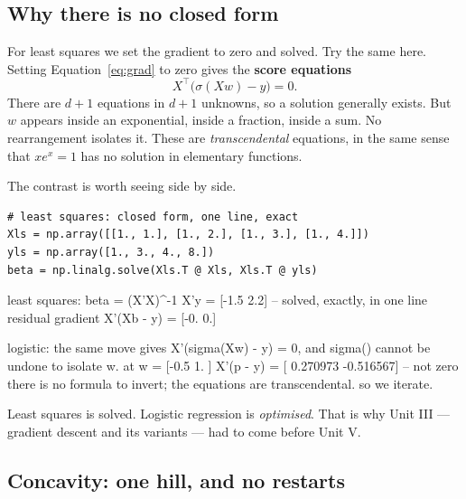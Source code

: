 \documentclass[11pt]{article}
\begin{document}
\subsection{Why there is no closed form}

For least squares we set the gradient to zero and solved. Try the same here.
Setting Equation~\eqref{eq:grad} to zero gives the \textbf{score equations}
\begin{equation}
  X^{\!\top}\bigl(\sigma(Xw) - y\bigr) = 0 .
  \label{eq:score}
\end{equation}
There are $d+1$ equations in $d+1$ unknowns, so a solution generally exists.
But $w$ appears inside an exponential, inside a fraction, inside a sum. No
rearrangement isolates it. These are \emph{transcendental} equations, in the
same sense that $x e^{x} = 1$ has no solution in elementary functions.

The contrast is worth seeing side by side.

\begin{lstlisting}
# least squares: closed form, one line, exact
Xls = np.array([[1., 1.], [1., 2.], [1., 3.], [1., 4.]])
yls = np.array([1., 3., 4., 8.])
beta = np.linalg.solve(Xls.T @ Xls, Xls.T @ yls)
\end{lstlisting}
\begin{codeout}
least squares: beta = (X'X)^-1 X'y = [-1.5  2.2]   -- solved, exactly, in one line
residual gradient X'(Xb - y) = [-0.  0.]

logistic: the same move gives  X'(sigma(Xw) - y) = 0,
          and sigma() cannot be undone to isolate w.
   at w = [-0.5  1. ]  X'(p - y) = [ 0.270973 -0.516567]  -- not zero
   there is no formula to invert; the equations are transcendental.
   so we iterate.
\end{codeout}

\begin{keyidea}
Least squares is solved. Logistic regression is \emph{optimised}. That is why
Unit III --- gradient descent and its variants --- had to come before Unit V.
\end{keyidea}

\subsection{Concavity: one hill, and no restarts}
\label{sec:concave}
\end{document}
